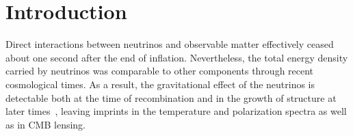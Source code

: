 \begin{quotation}
%

\end{quotation}

\section{Introduction}



Direct interactions between neutrinos and observable matter effectively ceased about one second after the end of inflation.  Nevertheless, the total energy density carried by neutrinos was comparable to other components through recent cosmological times.  As a result, the gravitational effect of the neutrinos is detectable both at the time of recombination and in the growth of structure at later times~\cite{Abazajian:2013oma}, leaving imprints in the temperature and polarization spectra as well as in CMB lensing.

